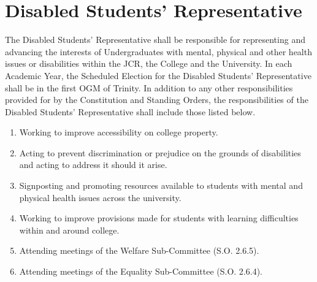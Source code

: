 \section{Disabled Students' Representative}
\npara The Disabled Students' Representative shall be responsible for representing and advancing the interests of Undergraduates with mental, physical and other health issues or disabilities within the JCR, the College and the University. 
\npara In each Academic Year, the Scheduled Election for the Disabled Students' Representative shall be in the first OGM of Trinity.
\npara In addition to any other responsibilities provided for by the Constitution and Standing Orders, the responsibilities of the Disabled Students' Representative shall include those listed below.
\begin{enumerate}
	\item Working to improve accessibility on college property.
	\item Acting to prevent discrimination or prejudice on the grounds of disabilities and acting to address it should it arise.
	\item Signposting and promoting resources available to students with mental and physical health issues across the university.
	\item Working to improve provisions made for students with learning difficulties within and around college.
	\item Attending meetings of the Welfare Sub-Committee (S.O. 2.6.5).
	\item Attending meetings of the Equality Sub-Committee (S.O. 2.6.4).
\end{enumerate}
